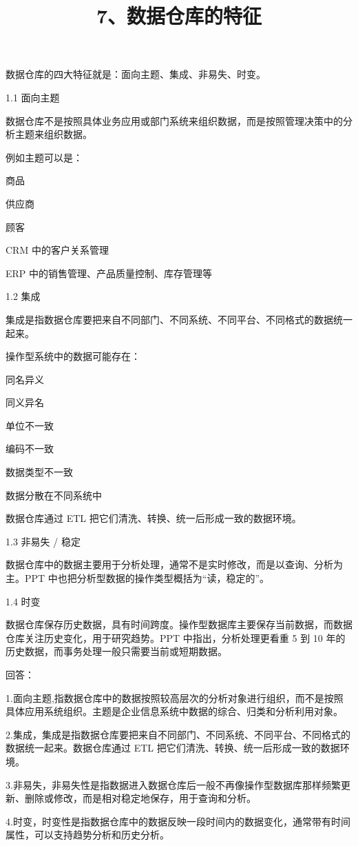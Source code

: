 \documentclass[UTF8,zihao=-4]{ctexart}
\begin{document}
\title{7、数据仓库的特征}
\author{}
\date{}
\maketitle

数据仓库的四大特征就是：面向主题、集成、非易失、时变。\par

1.1 面向主题\par

数据仓库不是按照具体业务应用或部门系统来组织数据，而是按照管理决策中的分析主题来组织数据。\par

例如主题可以是：\par

商品\par
供应商\par
顾客\par
CRM 中的客户关系管理\par
ERP 中的销售管理、产品质量控制、库存管理等\par


1.2 集成\par

集成是指数据仓库要把来自不同部门、不同系统、不同平台、不同格式的数据统一起来。\par

操作型系统中的数据可能存在：\par

同名异义\par
同义异名\par
单位不一致\par
编码不一致\par
数据类型不一致\par
数据分散在不同系统中\par

数据仓库通过 ETL 把它们清洗、转换、统一后形成一致的数据环境。\par

1.3 非易失 / 稳定\par

数据仓库中的数据主要用于分析处理，通常不是实时修改，而是以查询、分析为主。PPT 中也把分析型数据的操作类型概括为“读，稳定的”。\par


1.4 时变\par

数据仓库保存历史数据，具有时间跨度。操作型数据库主要保存当前数据，而数据仓库关注历史变化，用于研究趋势。PPT 中指出，分析处理更看重 5 到 10 年的历史数据，而事务处理一般只需要当前或短期数据。\par

回答：\par
1.面向主题,指数据仓库中的数据按照较高层次的分析对象进行组织，而不是按照具体应用系统组织。主题是企业信息系统中数据的综合、归类和分析利用对象。\par
2.集成，集成是指数据仓库要把来自不同部门、不同系统、不同平台、不同格式的数据统一起来。数据仓库通过 ETL 把它们清洗、转换、统一后形成一致的数据环境。\par
3.非易失，非易失性是指数据进入数据仓库后一般不再像操作型数据库那样频繁更新、删除或修改，而是相对稳定地保存，用于查询和分析。\par
4.时变，时变性是指数据仓库中的数据反映一段时间内的数据变化，通常带有时间属性，可以支持趋势分析和历史分析。\par
\end{document}
